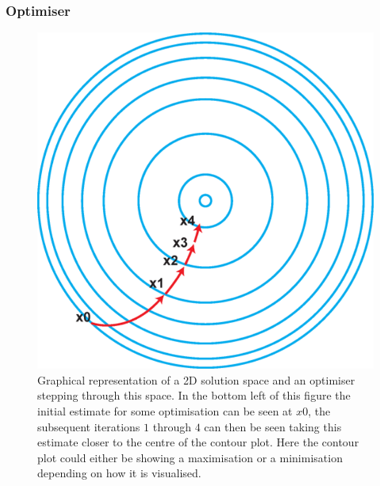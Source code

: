             \subsubsection{Optimiser} \label{sec:optimiser}
                \begin{figure}
                    \centering
                        
                    \includegraphics[width=1.0\linewidth]{figures/background_optimisation.png}
                        
                    \captionsetup{singlelinecheck=false}
                    \caption{
                        Graphical representation of a \gls{2D} solution space and an optimiser stepping through this space. In the bottom left of this figure the initial estimate for some optimisation can be seen at $x0$, the subsequent iterations $1$ through $4$ can then be seen taking this estimate closer to the centre of the contour plot. Here the contour plot could either be showing a maximisation or a minimisation depending on how it is visualised.
                    }
                    \label{fig:optimiser_optimisation}
                \end{figure}
                
